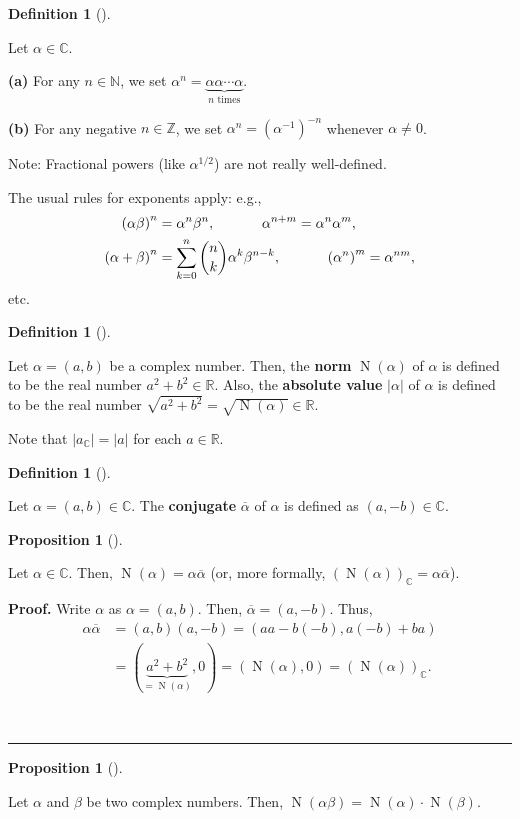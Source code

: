 \documentclass[numbers=enddot,12pt,final,onecolumn,notitlepage]{scrartcl}%
\numberwithin{exer}{subsection}
\theoremstyle{definition}
\newtheorem{prop}[theo]{Proposition}
\newenvironment{proposition}[1][]
{\begin{prop}[#1]\begin{leftbar}}
{\end{leftbar}\end{prop}}
\newtheorem{defi}[theo]{Definition}
\newenvironment{definition}[1][]
{\begin{defi}[#1]\begin{leftbar}}
{\end{leftbar}\end{defi}}
\newenvironment{proof}[1][Proof]{\noindent\textbf{#1.} }{\ \rule{0.5em}{0.5em}}
\let\sumnonlimits\sum
\renewcommand{\sum}{\sumnonlimits\limits}
\begin{document}
\begin{definition}
Let $\alpha\in\mathbb{C}$.

\textbf{(a)} For any $n\in\mathbb{N}$, we set $\alpha^{n}=\underbrace{\alpha
\alpha\cdots\alpha}_{n\text{ times}}$.

\textbf{(b)} For any negative $n\in\mathbb{Z}$, we set $\alpha^{n}=\left(
\alpha^{-1}\right)  ^{-n}$ whenever $\alpha\neq0$.
\end{definition}

Note: Fractional powers (like $\alpha^{1/2}$) are not really well-defined.

The usual rules for exponents apply: e.g.,%
\begin{align*}
\left(  \alpha\beta\right)  ^{n}  & =\alpha^{n}\beta^{n}%
,\ \ \ \ \ \ \ \ \ \ \alpha^{n+m}=\alpha^{n}\alpha^{m},\\
\left(  \alpha+\beta\right)  ^{n}  & =\sum_{k=0}^{n}\dbinom{n}{k}\alpha
^{k}\beta^{n-k},\ \ \ \ \ \ \ \ \ \ \left(  \alpha^{n}\right)  ^{m}%
=\alpha^{nm},
\end{align*}
etc.

\begin{definition}
Let $\alpha=\left(  a,b\right)  $ be a complex number. Then, the \textbf{norm}
$\operatorname*{N}\left(  \alpha\right)  $ of $\alpha$ is defined to be the
real number $a^{2}+b^{2}\in\mathbb{R}$. Also, the \textbf{absolute value}
$\left\vert \alpha\right\vert $ of $\alpha$ is defined to be the real number
$\sqrt{a^{2}+b^{2}}=\sqrt{\operatorname*{N}\left(  \alpha\right)  }%
\in\mathbb{R}$.
\end{definition}

Note that $\left\vert a_{\mathbb{C}}\right\vert =\left\vert a\right\vert $ for
each $a\in\mathbb{R}$.

\begin{definition}
Let $\alpha=\left(  a,b\right)  \in\mathbb{C}$. The \textbf{conjugate}
$\overline{\alpha}$ of $\alpha$ is defined as $\left(  a,-b\right)
\in\mathbb{C}$.
\end{definition}

\begin{proposition}
Let $\alpha\in\mathbb{C}$. Then, $\operatorname*{N}\left(  \alpha\right)
=\alpha\overline{\alpha}$ (or, more formally, $\left(  \operatorname*{N}%
\left(  \alpha\right)  \right)  _{\mathbb{C}}=\alpha\overline{\alpha}$).
\end{proposition}

\begin{proof}
Write $\alpha$ as $\alpha=\left(  a,b\right)  $. Then, $\overline{\alpha
}=\left(  a,-b\right)  $. Thus,%
\begin{align*}
\alpha\overline{\alpha}  & =\left(  a,b\right)  \left(  a,-b\right)  =\left(
aa-b\left(  -b\right)  ,a\left(  -b\right)  +ba\right)  \\
& =\left(  \underbrace{a^{2}+b^{2}}_{=\operatorname*{N}\left(  \alpha\right)
},0\right)  =\left(  \operatorname*{N}\left(  \alpha\right)  ,0\right)
=\left(  \operatorname*{N}\left(  \alpha\right)  \right)  _{\mathbb{C}}.
\end{align*}

\end{proof}

\begin{proposition}
Let $\alpha$ and $\beta$ be two complex numbers. Then, $\operatorname*{N}%
\left(  \alpha\beta\right)  =\operatorname*{N}\left(  \alpha\right)
\cdot\operatorname*{N}\left(  \beta\right)  $.
\end{proposition}
\end{document}
